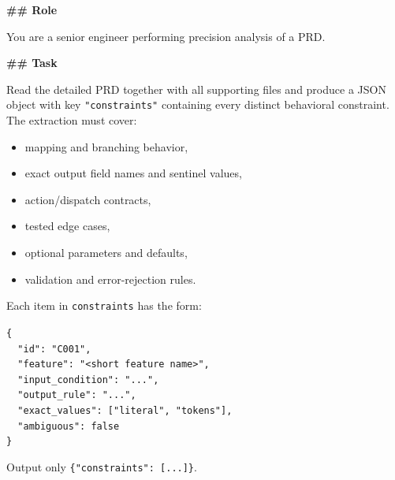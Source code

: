 \begin{promptbox}
\textbf{\#\# Role}

You are a senior engineer performing precision analysis of a PRD.

\textbf{\#\# Task}

Read the detailed PRD together with all supporting files and produce a JSON object with key \texttt{"constraints"} containing every distinct behavioral constraint. The extraction must cover:
\begin{itemize}
\item mapping and branching behavior,
\item exact output field names and sentinel values,
\item action/dispatch contracts,
\item tested edge cases,
\item optional parameters and defaults,
\item validation and error-rejection rules.
\end{itemize}

Each item in \texttt{constraints} has the form:

\texttt{\{}\\
\texttt{~~"id": "C001",}\\
\texttt{~~"feature": "<short feature name>",}\\
\texttt{~~"input\_condition": "...",}\\
\texttt{~~"output\_rule": "...",}\\
\texttt{~~"exact\_values": ["literal", "tokens"],}\\
\texttt{~~"ambiguous": false}\\
\texttt{\}}

Output only \texttt{\{"constraints": [...]\}}.
\end{promptbox}

